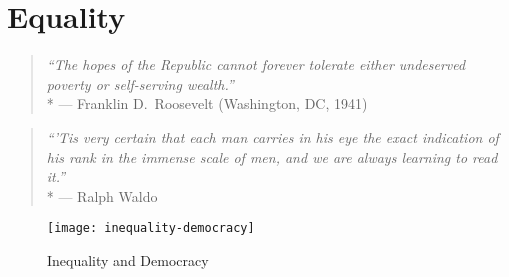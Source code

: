 \section{Equality}

\begin{quote}
	\emph{``The hopes of the Republic cannot forever tolerate either undeserved poverty or self-serving wealth.''}
	\\*
	--- Franklin D.\ Roosevelt (Washington, DC, 1941)
\end{quote}

\begin{quote}
	\emph{``'Tis very certain that each man carries in his eye the exact indication of his rank in the immense scale of men, and we are always learning to read it.''}
	\\*
	--- Ralph Waldo \citet{Emerson1860}
\end{quote}

 \begin{figure}[htbp]
	\centering
	\texttt{[image: inequality-democracy]}
	\caption{Inequality and Democracy}
	\label{fig:inequality-democracy}
\end{figure}




